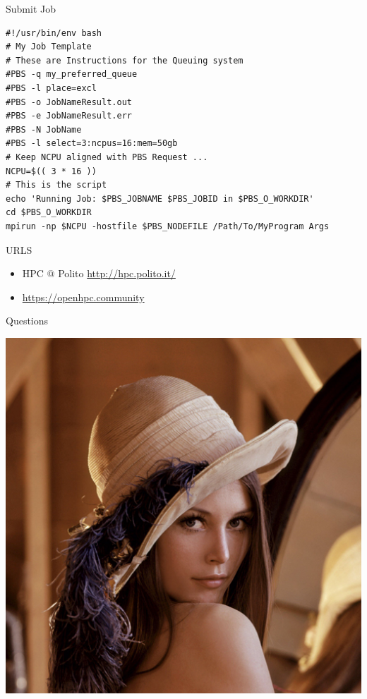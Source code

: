 \documentclass[ignorenonframetext,]{beamer}
\providecommand{\tightlist}{%
  \setlength{\itemsep}{0pt}\setlength{\parskip}{0pt}}
\begin{document}
\begin{frame}[fragile]{Submit Job}

\begin{verbatim}
#!/usr/bin/env bash
# My Job Template
# These are Instructions for the Queuing system
#PBS -q my_preferred_queue
#PBS -l place=excl
#PBS -o JobNameResult.out
#PBS -e JobNameResult.err
#PBS -N JobName
#PBS -l select=3:ncpus=16:mem=50gb
# Keep NCPU aligned with PBS Request ...
NCPU=$(( 3 * 16 ))
# This is the script
echo 'Running Job: $PBS_JOBNAME $PBS_JOBID in $PBS_O_WORKDIR'
cd $PBS_O_WORKDIR
mpirun -np $NCPU -hostfile $PBS_NODEFILE /Path/To/MyProgram Args
\end{verbatim}

\end{frame}

\begin{frame}{URLS}

\begin{itemize}
\tightlist
\item
  HPC @ Polito \url{http://hpc.polito.it/}
\end{itemize}


\begin{itemize}
\tightlist
\item
  \url{https://openhpc.community}
\end{itemize}


\end{frame}

\begin{frame}{Questions}

\includegraphics{images/Lenna-Q1.png}

\end{frame}
\end{document}
